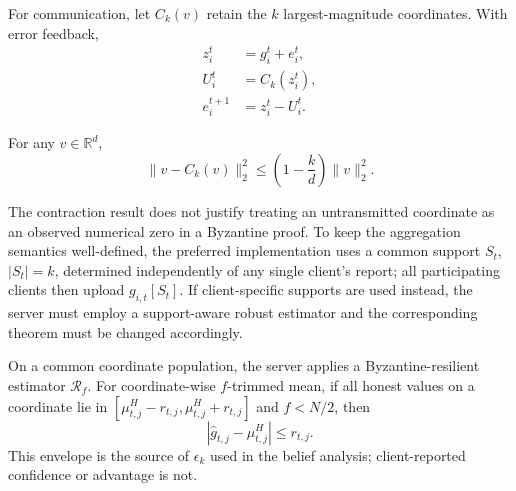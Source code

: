 For communication, let $C_k(v)$ retain the $k$ largest-magnitude coordinates. With error feedback,
\begin{align}
z_i^t&=g_i^t+e_i^t,\\
U_i^t&=C_k(z_i^t),\\
e_i^{t+1}&=z_i^t-U_i^t.
\end{align}

\begin{lemma}
For any $v\in\mathbb R^d$,
\begin{equation}
\|v-C_k(v)\|_2^2
\le\left(1-\frac{k}{d}\right)\|v\|_2^2.
\end{equation}
\end{lemma}

The contraction result does not justify treating an untransmitted coordinate as an observed numerical zero in a Byzantine proof. To keep the aggregation semantics well-defined, the preferred implementation uses a common support $S_t$, $|S_t|=k$, determined independently of any single client's report; all participating clients then upload $g_{i,t}[S_t]$. If client-specific supports are used instead, the server must employ a support-aware robust estimator and the corresponding theorem must be changed accordingly.

On a common coordinate population, the server applies a Byzantine-resilient estimator $\mathcal R_f$. For coordinate-wise $f$-trimmed mean, if all honest values on a coordinate lie in
$[\mu^H_{t,j}-r_{t,j},\mu^H_{t,j}+r_{t,j}]$ and $f<N/2$, then
\begin{equation}
|\widehat g_{t,j}-\mu^H_{t,j}|\le r_{t,j}.
\end{equation}
This envelope is the source of $\epsilon_k$ used in the belief analysis; client-reported confidence or advantage is not.


